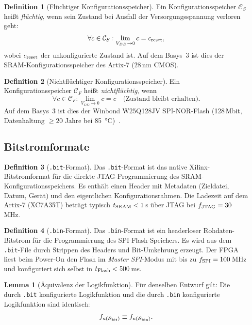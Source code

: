 ﻿\documentclass[a4paper,12pt]{article}
\theoremstyle{definition}
\newtheorem{definition}{Definition}
\newtheorem{lemma}{Lemma}
\begin{document}
\begin{definition}[Flüchtiger Konfigurationsspeicher]
    Ein Konfigurationsspeicher $\mathcal{C}_S$ heißt \emph{flüchtig}, wenn
    sein Zustand bei Ausfall der Versorgungsspannung verloren geht:
    \[
    \forall c \in \mathcal{C}_S: \lim_{V_{DD} \to 0} c = c_{\rm reset},
    \]
    wobei $c_{\rm reset}$ der unkonfigurierte Zustand ist. Auf dem Basys~3
    ist dies der SRAM-Konfigurationsspeicher des Artix-7 (28\,nm CMOS).
\end{definition}

\begin{definition}[Nichtflüchtiger Konfigurationsspeicher]
    Ein Konfigurationsspeicher $\mathcal{C}_F$ heißt \emph{nichtflüchtig}, wenn
    \[
    \forall c \in \mathcal{C}_F: \lim_{V_{DD} \to 0} c = c \quad
    \text{(Zustand bleibt erhalten)}.
    \]
    Auf dem Basys~3 ist dies der Winbond W25Q128JV SPI-NOR-Flash
    (128\,Mbit, Datenhaltung $\geq 20$ Jahre bei 85\, °C)~\cite{winbond2021}.
\end{definition}

\subsection{Bitstromformate}

\begin{definition}[\texttt{.bit}-Format]
    Das \texttt{.bit}-Format ist das native Xilinx-Bitstromformat für die
    direkte JTAG-Programmierung des SRAM-Konfigurationsspeichers.
    Es enthält einen Header mit Metadaten (Zieldatei, Datum, Gerät) und
    den eigentlichen Konfigurationsrahmen. Die Ladezeit auf dem Artix-7
    (XC7A35T) beträgt typisch $t_{\rm SRAM} < 1$\,s über JTAG bei
    $f_{\rm JTAG} = 30$\,MHz.
\end{definition}

\begin{definition}[\texttt{.bin}-Format]
    Das \texttt{.bin}-Format ist ein headerloser Rohdaten-Bitstrom für die
    Programmierung des SPI-Flash-Speichers. Es wird aus dem \texttt{.bit}-File
    durch Strippen des Headers und Bit-Umkehrung erzeugt. Der FPGA liest beim
    Power-On den Flash im \emph{Master SPI}-Modus mit bis zu
    $f_{\rm SPI} = 100$\,MHz und konfiguriert sich selbst in
    $t_{\rm Flash} < 500$\,ms.
\end{definition}

\begin{lemma}[Äquivalenz der Logikfunktion]
    \label{lem:aequiv}
    Für denselben Entwurf gilt: Die durch \texttt{.bit} konfigurierte
    Logikfunktion und die durch \texttt{.bin} konfigurierte Logikfunktion
    sind identisch:
    \[
    f_{\kappa(\mathcal{B}_{\rm bit})} \equiv f_{\kappa(\mathcal{B}_{\rm bin})}.
    \]
\end{lemma}
\end{document}

